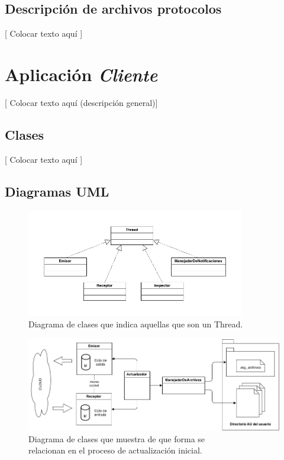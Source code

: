 \documentclass{article}
\begin{document}
\subsection{Descripción de archivos  protocolos}

	[ Colocar texto aquí ]
\bigskip




\section{Aplicación \textit{Cliente}}

	[ Colocar texto aquí (descripción general)]
\bigskip



\subsection{Clases}

	[ Colocar texto aquí ]
\bigskip



\subsection{Diagramas UML}


\begin{figure}[h]
	\centering
	\includegraphics[width=0.85\textwidth]{images/Diagrama-modelo-cliente-threads.png}
	\caption{Diagrama de clases que indica aquellas que son un Thread.}
\end{figure}
\bigskip


\begin{figure}[h]
	\centering
	\includegraphics[width=1.0\textwidth]{images/Diagrama-modelo-cliente-actualizacion.png}
	\medskip
	\caption{Diagrama de clases que muestra de que forma se \\ relacionan en el proceso de actualización inicial.}
\end{figure}
\bigskip
\end{document}
